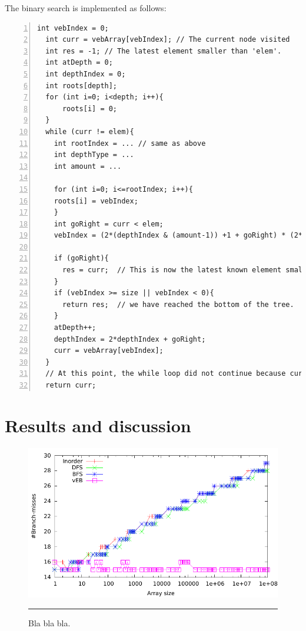 The binary search is implemented as follows:
\begin{lstlisting}[numbers=left]
  int vebIndex = 0;
  int curr = vebArray[vebIndex]; // The current node visited
  int res = -1; // The latest element smaller than 'elem'.
  int atDepth = 0;
  int depthIndex = 0;
  int roots[depth];
  for (int i=0; i<depth; i++){
      roots[i] = 0;
  }
  while (curr != elem){
    int rootIndex = ... // same as above
    int depthType = ...
    int amount = ...
    
    for (int i=0; i<=rootIndex; i++){
	roots[i] = vebIndex;
    }
    int goRight = curr < elem;
    vebIndex = (2*(depthIndex & (amount-1)) +1 + goRight) * (2*amount -1) + roots[depthType];

    if (goRight){
      res = curr;  // This is now the latest known element smaller than 'elem'.
    }
    if (vebIndex >= size || vebIndex < 0){
      return res;  // we have reached the bottom of the tree.
    }
    atDepth++;
    depthIndex = 2*depthIndex + goRight;
    curr = vebArray[vebIndex];
  }
  // At this point, the while loop did not continue because curr==elem
  return curr;
\end{lstlisting}








\section{Results and discussion}



\begin{figure}[htbp]
	\centering
		\includegraphics[width=\textwidth]{./Figures/Project1/Branch_misses.pdf}
		\rule{35em}{0.5pt}
	\caption[Branch misses]{
	Bla bla bla.
	}
	\label{fig:Branch_misses_p1}
\end{figure}


